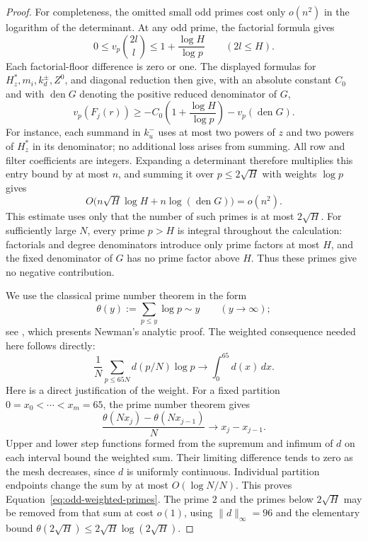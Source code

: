 \begin{proof}
For completeness, the omitted small odd primes cost only $o(n^2)$
in the logarithm of the determinant.  At any odd prime, the factorial
formula gives
\[
 0\le v_p\binom{2l}{l}\le1+\frac{\log H}{\log p}
 \qquad(2l\le H).
\]
Each factorial-floor difference is zero or one.  The displayed
formulas for $H_z^*,m_i,k_d^\pm,Z^0$, and diagonal reduction then
give, with an absolute constant $C_0$ and with
$\operatorname{den}G$ denoting the positive reduced denominator of $G$,
\[
 v_p(F_j(r))\ge
   -C_0\left(1+\frac{\log H}{\log p}\right)-v_p(\operatorname{den}G).
\]
For instance, each summand in $k^-_u$ uses at most two powers of
$z$ and two powers of $H_z^*$ in its denominator; no additional
loss arises from summing.  All row and filter coefficients are
integers.  Expanding a determinant therefore multiplies this entry
bound by at most $n$, and summing it over $p\le2\sqrt H$ with
weights $\log p$ gives
\[
 O\bigl(n\sqrt H\log H+n\log(\operatorname{den}G)\bigr)
       =o(n^2).
\]
This estimate uses only that the number of such primes is at most
$2\sqrt H$.  For sufficiently large $N$, every prime $p>H$ is
integral throughout the calculation: factorials and degree
denominators introduce only prime factors at most $H$, and the fixed
denominator of $G$ has no prime factor above $H$.  Thus these primes
give no negative contribution.

We use the classical prime number theorem in the form
\[
 \theta(y):=\sum_{p\le y}\log p\sim y
       \qquad(y\to\infty);
\]
see \cite[Step~VI, p.~707]{Zagier1997}, which presents Newman's analytic
proof. The weighted consequence needed here follows directly:
\begin{equation}\label{eq:odd-weighted-primes}
 \frac1N\sum_{p\le65N}d(p/N)\log p
       \longrightarrow\int_0^{65}d(x)\,dx.
\end{equation}
Here is a direct justification of the weight.  For a fixed partition
$0=x_0<\cdots<x_m=65$, the prime number theorem gives
\[
 \frac{\theta(Nx_j)-\theta(Nx_{j-1})}{N}
       \longrightarrow x_j-x_{j-1}.
\]
Upper and lower step functions formed from the supremum and infimum
of $d$ on each interval bound the weighted sum.  Their limiting
difference tends to zero as the mesh decreases, since $d$ is
uniformly continuous.  Individual partition endpoints change the
sum by at most $O(\log N/N)$.  This proves
Equation~\eqref{eq:odd-weighted-primes}.  The prime $2$ and the
primes below $2\sqrt H$ may be removed from that sum at cost $o(1)$,
using $\|d\|_\infty=96$ and the elementary bound
$\theta(2\sqrt H)\le2\sqrt H\log(2\sqrt H)$.


\end{proof}
